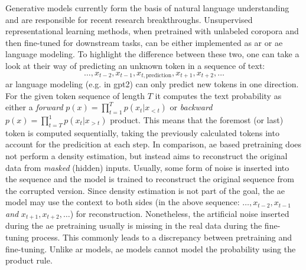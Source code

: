 Generative models currently form the basis of natural language understanding and are responsible for recent research breakthroughs. Unsupervised representational learning methods, when pretrained with unlabeled coropora and then fine-tuned for downstream tasks, can be either implemented as \gls{ar} or \gls{ae} language modeling. To highlight the difference between these two, one can take a look at their way of predicting an unknown token in a sequence of text:
\begin{equation}
	\dots, x_{t-2}, x_{t-1}, x_{t, \text{prediction}}, x_{t+1}, x_{t+2}, \dots
\end{equation}
\gls{ar} language modeling (e.g. in \gls{gpt2}) can only predict new tokens in one direction. For the given token sequence of length $ T $ it computes the text probability as either a \textit{forward} $ p(x) = \prod_{t=1}^{T} p(x_t | x_{<t}) $ or \textit{backward} $ p(x) = \prod_{t=T}^{1} p(x_t | x_{>t}) $ product. This means that the foremost (or last) token is computed sequentially, taking the previously calculated tokens into account for the predicition at each step. In comparison, \gls{ae} based pretraining does not perform a density estimation, but instead aims to reconstruct the original data from \textit{masked} (hidden) inputs. Usually, some form of noise is inserted into the sequence and the model is trained to reconstruct the original sequence from the corrupted version. Since density estimation is not part of the goal, the \gls{ae} model may use the context to both sides (in the above sequence: $ \dots, x_{t-2}, x_{t-1} $ \textit{and} $ x_{t+1}, x_{t+2}, \dots $) for reconstruction. Nonetheless, the artificial noise inserted during the \gls{ae} pretraining usually is missing in the real data during the fine-tuning process. This commonly leads to a discrepancy between pretraining and fine-tuning. Unlike \gls{ar} models, \gls{ae} models cannot model the probability using the product rule.
